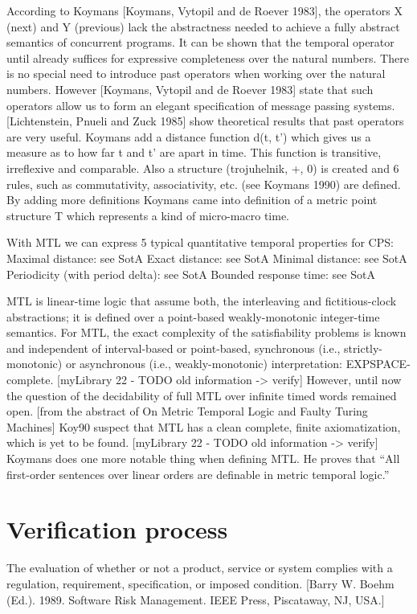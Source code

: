According to Koymans [Koymans, Vytopil and de Roever 1983], the operators X (next) and Y (previous) lack the abstractness needed to achieve a fully abstract semantics of concurrent programs. It can be shown that the temporal operator until already suffices for expressive completeness over the natural numbers. There is no special need to introduce past operators when working over the natural numbers. However [Koymans, Vytopil and de Roever 1983] state that such operators allow us to form an elegant specification of message passing systems. [Lichtenstein, Pnueli and Zuck 1985] show theoretical results that past operators are very useful. Koymans add a distance function d(t, t’) which gives us a measure as to how far t and t’ are apart in time. This function is transitive, irreflexive and comparable. Also a structure (trojuhelnik, +, 0) is created and 6 rules, such as commutativity, associativity, etc. (see Koymans 1990) are defined. By adding more definitions Koymans came into definition of a metric point structure T which represents a kind of micro-macro time. 

With MTL we can express 5 typical quantitative temporal properties for CPS:
Maximal distance: see SotA
Exact distance: see SotA
Minimal distance: see SotA
Periodicity (with period delta): see SotA
Bounded response time: see SotA

MTL is linear-time logic that assume both, the interleaving and fictitious-clock abstractions; it is defined over a point-based weakly-monotonic integer-time semantics. For MTL, the exact complexity of the satisfiability problems is known and independent of interval-based or point-based, synchronous (i.e., strictly-monotonic) or asynchronous (i.e., weakly-monotonic) interpretation: EXPSPACE-complete. [myLibrary 22 - TODO old information -> verify] However, until now the question of the decidability of full MTL over infinite timed words remained open. [from the abstract of On Metric Temporal Logic and Faulty Turing Machines] Koy90 suspect that MTL has a clean complete, finite axiomatization, which is yet to be found. [myLibrary 22 - TODO old information -> verify] Koymans does one more notable thing when defining MTL. He proves that “All first-order sentences over linear orders are definable in metric temporal logic.”

\section{Verification process}

The evaluation of whether or not a product, service or system complies with a regulation, requirement, specification, or imposed condition. [Barry W. Boehm (Ed.). 1989. Software Risk Management. IEEE Press, Piscataway, NJ, USA.]

